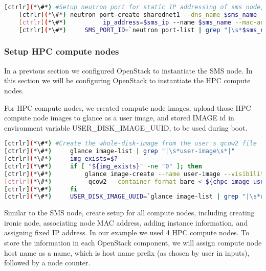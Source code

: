     
    \begin{lstlisting}[language=bash,keywords={}]
    [ctrlr](*\#*) #Setup neutron port for static IP addressing of sms node, this is an optional part
    [ctrlr](*\#*) neutron port-create sharednet1 --dns_name $sms_name --fixed-ip \
    [ctrlr](*\#*)          ip_address=$sms_ip --name $sms_name --mac-address $sms_mac
    [ctrlr](*\#*)     SMS_PORT_ID=`neutron port-list | grep "|\s*$sms_name\s*|" | awk '{print $2}'`
	\end{lstlisting} 

\newpage
\subsubsection{Setup HPC compute nodes}

	In a previous section we configured OpenStack to instantiate the SMS node. In this section we will be configuring OpenStack to instantiate the HPC compute nodes.

	For HPC compute nodes, we created compute node images, upload those HPC compute node images to glance as a user image, and stored IMAGE id in environment variable USER\_DISK\_IMAGE\_UUID, to be used during boot.


\begin{lstlisting}[language=bash,keywords={}]
[ctrlr](*\#*) #Create the whole-disk-image from the user's qcow2 file
[ctrlr](*\#*)     glance image-list | grep "|\s*user-image\s*|"
[ctrlr](*\#*)     img_exists=$?
[ctrlr](*\#*)     if [ "${img_exists}" -ne "0" ]; then
[ctrlr](*\#*)         glance image-create --name user-image --visibility public --disk-format \
[ctrlr](*\#*)          qcow2 --container-format bare < ${chpc_image_user}
[ctrlr](*\#*)     fi
[ctrlr](*\#*)     USER_DISK_IMAGE_UUID=`glance image-list | grep "|\s*user-image\s*|" | awk '{print $2}'`
\end{lstlisting} 


	Similar to the SMS node, create setup for all compute nodes, including creating ironic node, associating node MAC address, adding instance information, and assigning fixed IP address. In our example we used 4 HPC compute nodes. To store the information in each OpenStack component, we will assign compute node host name as a name, which is host name prefix (as chosen by user in inputs), followed by a node counter. 

